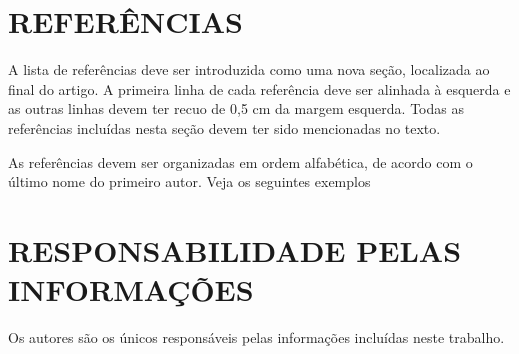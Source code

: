 \documentclass[10pt,fleqn,a4paper,twoside]{article}
\begin{document}
\section{REFERÊNCIAS} 

A lista de referências deve ser introduzida como uma nova seção, localizada ao final do artigo. A primeira linha de cada referência deve ser alinhada à esquerda e as outras linhas devem ter recuo de 0,5 cm da margem esquerda. Todas as referências incluídas nesta seção devem ter sido mencionadas no texto.

As referências devem ser organizadas em ordem alfabética, de acordo com o último nome do primeiro autor. Veja os seguintes exemplos


\renewcommand{\refname}{}


\section{RESPONSABILIDADE PELAS INFORMAÇÕES}

Os autores são os únicos responsáveis pelas informações incluídas neste trabalho.
\end{document}
